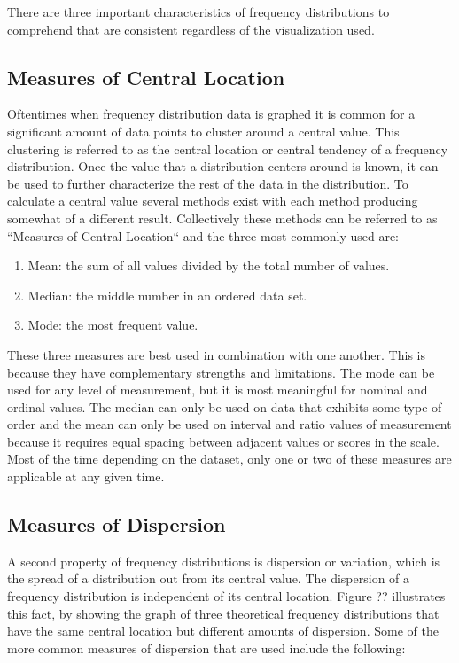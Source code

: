 There are three important characteristics of frequency distributions to comprehend
that are consistent regardless of the visualization used.

\subsection{Measures of Central Location}

Oftentimes when frequency distribution data is graphed it is common for a significant
amount of data points to cluster around a central value. This clustering is referred to
as the central location or central tendency of a frequency distribution. Once the 
value that a distribution centers around is known, it can be used to further 
characterize the rest of the data in the distribution. To calculate a central value 
several methods exist with each method producing somewhat of a different result. 
Collectively these methods can be referred to as ``Measures of Central Location`` 
and the three most commonly used are:

\begin{enumerate}
    \item Mean: the sum of all values divided by the total number of values.
    \item Median: the middle number in an ordered data set.
    \item Mode: the most frequent value.
\end{enumerate}

These three measures are best used in combination with one another. This is because 
they have complementary strengths and limitations. The mode can be used for any 
level of measurement, but it is most meaningful for nominal and ordinal values.
The median can only be used on data that exhibits some type of order and the mean 
can only be used on interval and ratio values of measurement because it requires 
equal spacing between adjacent values or scores in the scale. Most of the time 
depending on the dataset, only one or two of these measures are applicable at any 
given time.

\subsection{Measures of Dispersion}

A second property of frequency distributions is dispersion or variation, which is 
the spread of a distribution out from its central value. The dispersion of a frequency 
distribution is independent of its central location. Figure ?? illustrates this 
fact, by showing the graph of three theoretical frequency distributions that have 
the same central location but different amounts of dispersion. Some of the more common
measures of dispersion that are used include the following:

